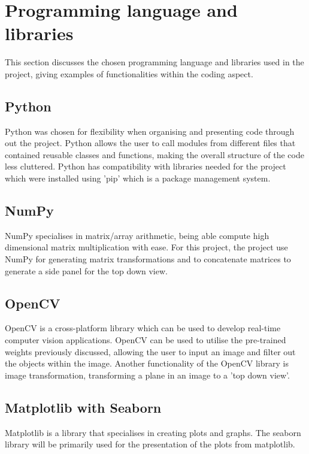 \documentclass[12pt]{report}
\begin{document}
\section{Programming language and libraries}

This section discusses the chosen programming language and libraries used in the project, giving examples of functionalities within the coding aspect.

\subsection*{Python}

Python was chosen for flexibility when organising and presenting code through out the project. Python allows the user to call modules from different files that contained reusable classes and functions, making the overall structure of the code less cluttered. Python has compatibility with libraries needed for the project which were installed using 'pip' which is a package management system.

\subsection*{NumPy}

NumPy specialises in matrix/array arithmetic, being able compute high dimensional matrix multiplication with ease. For this project, the project use NumPy for generating matrix transformations and to concatenate matrices to generate a side panel for the top down view. 

\subsection*{OpenCV}

OpenCV is a cross-platform library which can be used to develop real-time computer vision applications. OpenCV can be used to utilise the pre-trained weights previously discussed, allowing the user to input an image and filter out the objects within the image. Another functionality of the OpenCV library is image transformation, transforming a plane in an image to a 'top down view'.


\subsection*{Matplotlib with Seaborn}

Matplotlib is a library that specialises in creating plots and graphs. The seaborn library will be primarily used for the presentation of the plots from matplotlib.
\end{document}

